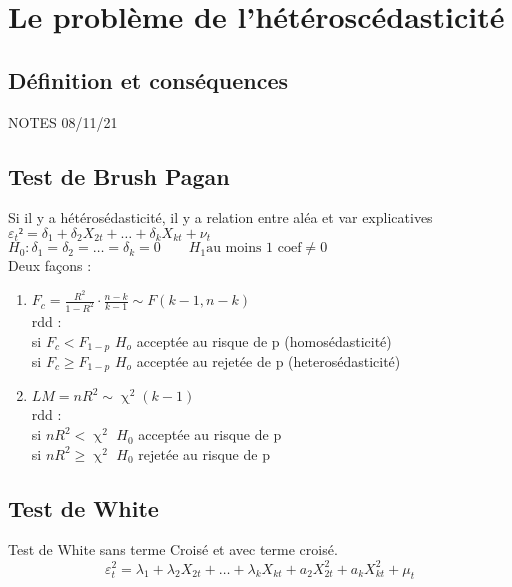 \documentclass{article}
\begin{document}
\section{Le problème de l'hétéroscédasticité}
\subsection{Définition et conséquences}



NOTES 08/11/21 \\
\subsection{Test de Brush Pagan}
Si il y a hétérosédasticité, il y a relation entre aléa et var explicatives \\
$\varepsilon_{t}² = \delta_{1} + \delta_{2} X_{2t} + \ldots + \delta_{k} X_{kt} + \nu_{t}$ \\
$H_0 : \delta_1 = \delta_2 = \ldots = \delta_k = 0 \qquad H_1 \text{au moins 1 coef} \neq 0$ \\
Deux façons : 
\begin{enumerate}
    \item $F_{c} = \frac{R^2}{1-R^2} \cdot \frac{n-k}{k-1} \sim F(k-1, n-k)$ \\
        rdd :\\
        si $F_c < F_{1-p}$ $H_o$ acceptée au risque de p (homosédasticité)\\
        si $F_c \ge   F_{1-p}$ $H_o$ acceptée au rejetée de p (heterosédasticité) \\
    \item $LM = n R^2 \sim \upchi^2(k-1)$ \\
        rdd :\\
        si $nR^2 < \upchi^2$ $H_0$ acceptée au risque de p \\
        si $nR^2 \ge \upchi^2$ $H_0$ rejetée au risque de p
\end{enumerate}

\subsection{Test de White}
Test de White sans terme Croisé et avec terme croisé.
\begin{equation}
    \varepsilon_{t}^2 = \lambda_1 + \lambda_2 X_{2t} + \ldots + \lambda_k X_{kt} + a_2 X_{2t}^2
    + a_k X_{kt}^2+ \mu_t
\end{equation}
\end{document}
